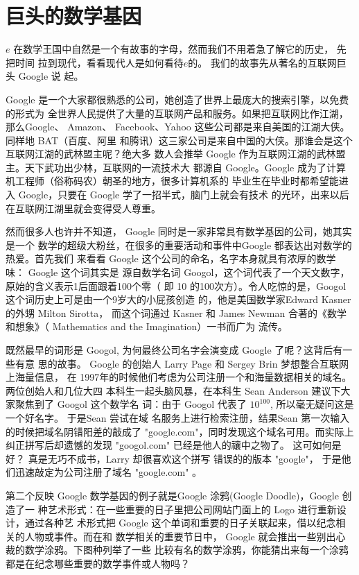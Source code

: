\section{巨头的数学基因}
$e$ 在数学王国中自然是一个有故事的字母，然而我们不用着急了解它的历史， 先把时间
拉到现代，看看现代人是如何看待$e$的。 我们的故事先从著名的互联网巨头 Google 说
起。

Google 是一个大家都很熟悉的公司，她创造了世界上最庞大的搜索引擎，以免费的形式为
全世界人民提供了大量的互联网产品和服务。如果把互联网比作江湖，那么Google、
Amazon、 Facebook、Yahoo 这些公司都是来自美国的江湖大侠。同样地 BAT（百度、阿里
和腾讯）这三家公司是来自中国的大侠。那谁会是这个互联网江湖的武林盟主呢？绝大多
数人会推举 Google 作为互联网江湖的武林盟主。天下武功出少林，互联网的一流技术大
都源自 Google。Google 成为了计算机工程师（俗称码农）朝圣的地方，很多计算机系的
毕业生在毕业时都希望能进入 Google，只要在 Google 学了一招半式，脑门上就会有技术
的光环，出来以后在互联网江湖里就会变得受人尊重。

然而很多人也许并不知道， Google 同时是一家非常具有数学基因的公司，她其实是一个
数学的超级大粉丝，在很多的重要活动和事件中Google 都表达出对数学的热爱。首先我们
来看看 Google 这个公司的命名，名字本身就具有浓厚的数学味： Google 这个词其实是
源自数学名词 Googol，这个词代表了一个天文数字，原始的含义表示1后面跟着100个零（
即 10 的100次方）。令人吃惊的是，Googol这个词历史上可是由一个9岁大的小屁孩创造
的，他是美国数学家Edward Kasner 的外甥 Milton Sirotta， 而这个词通过 Kasner 和
James Newman 合著的《数学和想象》（ Mathematics and the Imagination）一书而广为
流传。

既然最早的词形是 Googol, 为何最终公司名字会演变成 Google 了呢？这背后有一些有意
思的故事。 Google 的创始人 Larry Page 和 Sergey Brin 梦想整合互联网上海量信息，
在 1997年的时候他们考虑为公司注册一个和海量数据相关的域名。两位创始人和几位大四
本科生一起头脑风暴，在本科生 Sean Anderson 建议下大家聚焦到了 Googol 这个数学名
词：由于 Googol 代表了 $10^100$, 所以毫无疑问这是一个好名字。 于是Sean 尝试在域
名服务上进行检索注册，结果Sean 第一次输入的时候把域名阴错阳差的敲成了
"google.com"，同时发现这个域名可用。而实际上纠正拼写后却遗憾的发现 "googol.com"
已经是他人的禳中之物了。 这可如何是好？ 真是无巧不成书，Larry 却很喜欢这个拼写
错误的的版本 "google"， 于是他们迅速敲定为公司注册了域名 "google.com" 。

第二个反映 Google 数学基因的例子就是Google 涂鸦(Google Doodle)，Google 创造了一
种艺术形式：在一些重要的日子里把公司网站门面上的 Logo 进行重新设计，通过各种艺
术形式把 Google 这个单词和重要的日子关联起来，借以纪念相关的人物或事件。而在和
数学相关的重要节日中， Google 就会推出一些别出心裁的数学涂鸦。下图种列举了一些
比较有名的数学涂鸦，你能猜出来每一个涂鸦都是在纪念哪些重要的数学事件或人物吗？

